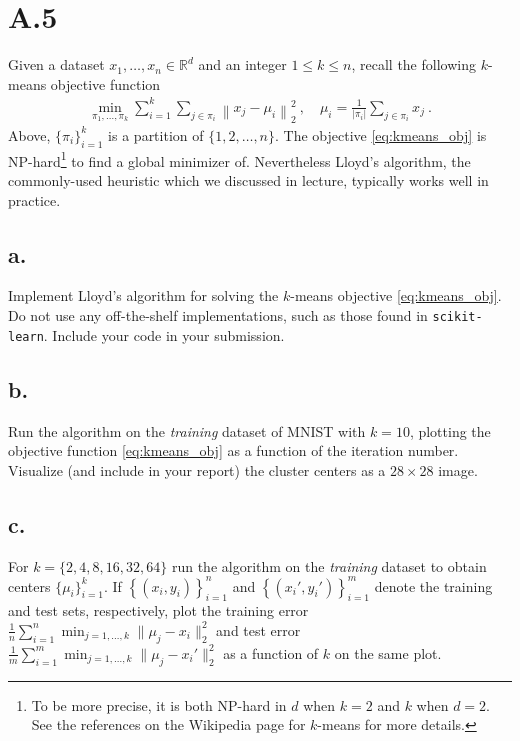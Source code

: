 \documentclass{article}
\newcommand{\field}[1]{\mathbb{#1}}
\newcommand{\1}{\mathbf{1}}
\newcommand{\R}{\field{R}} %
\newcommand{\norm}[1]{\left\|#1\right\|}
\newcommand{\twonorm}[1]{\|#1\|_2^2}
\begin{document}
\section*{A.5}
{\Large 

Given a dataset $x_1, \dots, x_n \in \R^{d}$ and an integer $1 \leq k \leq n$, recall the following $k$-means objective function
\begin{align}
    \min_{\pi_1, \ldots, \pi_k} \sum_{i=1}^{k} \sum_{j \in \pi_i} \norm{ x_j - \mu_{i} }^2_2 \ , \quad \mu_i = \frac{1}{|\pi_i|} \sum_{j \in \pi_i} x_j \ . \label{eq:kmeans_obj}
\end{align}
Above, $\{\pi_i\}_{i=1}^{k}$ is a partition of $\{1, 2, \ldots, n\}$. The objective \eqref{eq:kmeans_obj} is NP-hard\footnote{To be more precise, it is both NP-hard in $d$ when $k=2$ and $k$ when $d=2$. See the references on the Wikipedia page for $k$-means for more details.} to find a global minimizer of. Nevertheless Lloyd's algorithm, the commonly-used heuristic which we discussed in lecture, typically works well in practice.

\subsection*{a.}

Implement Lloyd's algorithm for solving the $k$-means objective \eqref{eq:kmeans_obj}. Do not use any off-the-shelf implementations, such as those found in \texttt{scikit-learn}. Include your code in your submission.

\subsection*{b.}

Run the algorithm on the \emph{training} dataset of MNIST with $k=10$, plotting the objective function \eqref{eq:kmeans_obj} as a function of the iteration number. Visualize (and include in your report) the cluster centers as a $28\times 28$ image.

\subsection*{c.}

For $k=\{2, 4, 8, 16, 32, 64\}$ run the algorithm on the \emph{training} dataset to obtain centers $\{\mu_{i}\}_{i=1}^k$. If $\left\{\left(x_i,y_i\right)\right\}_{i=1}^n$ and $\left\{\left(x_i',y_i'\right)\right\}_{i=1}^m$ denote the training and test sets, respectively, plot the training error $\frac{1}{n} \sum_{i=1}^n \min_{j=1,\dots,k} \twonorm{ \mu_j - x_i }$ and test error $\frac{1}{m} \sum_{i=1}^m \min_{j=1,\dots,k} \twonorm{ \mu_j - x_i' }$ as a function of $k$ on the same plot.

}
\end{document}
